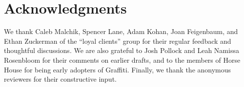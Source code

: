 \section{Acknowledgments}

We thank Caleb Malchik, Spencer Lane, Adam Kohan,
Joan Feigenbaum, and Ethan Zuckerman of the ``loyal clients'' group
for their regular feedback and thoughtful discussions.
We are also grateful to Josh Pollock and Leah Namissa Rosenbloom for their
comments on earlier drafts, and to the members of Horse House
for being early adopters of Graffiti.
Finally, we thank the anonymous reviewers for their constructive input.
